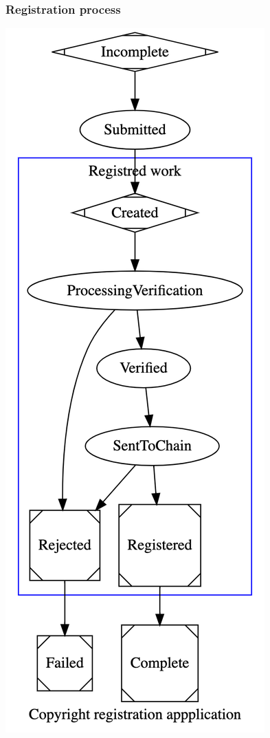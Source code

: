 \documentclass[12pt]{article}
\begin{document}
\subsubsection{Registration process}
\includegraphics[width=\textwidth,height=\textheight,keepaspectratio]{images/operational/cpy-registration-status-graph}
\end{document}
